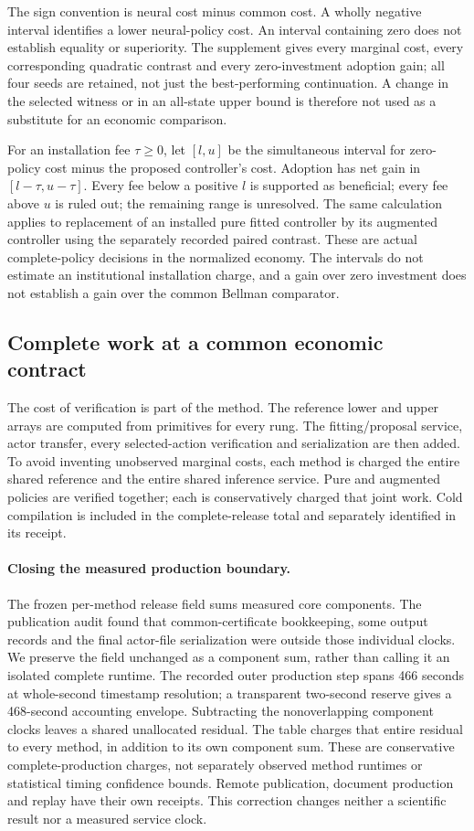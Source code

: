The sign convention is neural cost minus common cost. A wholly negative interval identifies a lower neural-policy cost. An interval containing zero does not establish equality or superiority. The supplement gives every marginal cost, every corresponding quadratic contrast and every zero-investment adoption gain; all four seeds are retained, not just the best-performing continuation. A change in the selected witness or in an all-state upper bound is therefore not used as a substitute for an economic comparison.

For an installation fee $\tau\ge0$, let $[l,u]$ be the simultaneous interval for zero-policy cost minus the proposed controller's cost. Adoption has net gain in $[l-\tau,u-\tau]$. Every fee below a positive $l$ is supported as beneficial; every fee above $u$ is ruled out; the remaining range is unresolved. The same calculation applies to replacement of an installed pure fitted controller by its augmented controller using the separately recorded paired contrast. These are actual complete-policy decisions in the normalized economy. The intervals do not estimate an institutional installation charge, and a gain over zero investment does not establish a gain over the common Bellman comparator.

\subsection{Complete work at a common economic contract}
The cost of verification is part of the method. The reference lower and upper arrays are computed from primitives for every rung. The fitting/proposal service, actor transfer, every selected-action verification and serialization are then added. To avoid inventing unobserved marginal costs, each method is charged the entire shared reference and the entire shared inference service. Pure and augmented policies are verified together; each is conservatively charged that joint work. Cold compilation is included in the complete-release total and separately identified in its receipt.


\paragraph{Closing the measured production boundary.}
The frozen per-method release field sums measured core components. The publication audit found that common-certificate bookkeeping, some output records and the final actor-file serialization were outside those individual clocks. We preserve the field unchanged as a component sum, rather than calling it an isolated complete runtime. The recorded outer production step spans 466 seconds at whole-second timestamp resolution; a transparent two-second reserve gives a 468-second accounting envelope. Subtracting the nonoverlapping component clocks leaves a shared unallocated residual. The table charges that entire residual to every method, in addition to its own component sum. These are conservative complete-production charges, not separately observed method runtimes or statistical timing confidence bounds. Remote publication, document production and replay have their own receipts. This correction changes neither a scientific result nor a measured service clock.


